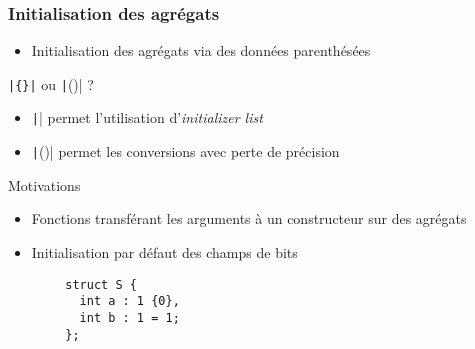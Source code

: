 \documentclass[C++.tex]{subfiles}
\begin{document}
\begin{frame}[fragile]
	\frametitle{Initialisation des agrégats}
	\begin{itemize}
		\item Initialisation des agrégats via des données parenthésées
	\end{itemize}

	\begin{block}{\texttt{|\{\}|} ou \texttt|()| ?}
		\begin{itemize}
			\item \texttt|{}| permet l'utilisation d'\textit{initializer list}
			\item \texttt|()| permet les conversions avec perte de précision
		\end{itemize}
	\end{block}

	\begin{block}{Motivations}
		\begin{itemize}
			\item Fonctions transférant les arguments à un constructeur sur des agrégats
		\end{itemize}
	\end{block}


	\begin{itemize}
		\item Initialisation par défaut des champs de bits
	\end{itemize}

	\begin{verbatim}
		struct S {
		  int a : 1 {0},
		  int b : 1 = 1;
		};
	\end{verbatim}

\end{frame}
\end{document}
